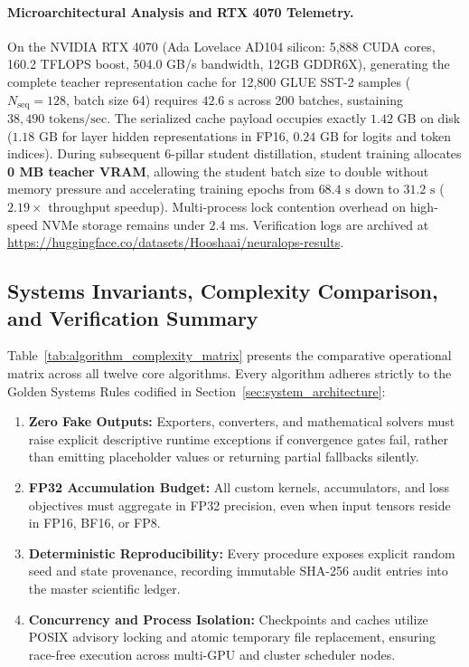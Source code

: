 \paragraph{Microarchitectural Analysis and RTX 4070 Telemetry.}
On the NVIDIA RTX 4070 (Ada Lovelace AD104 silicon: 5,888 CUDA cores, 160.2 TFLOPS boost, 504.0 GB/s bandwidth, 12GB GDDR6X), generating the complete teacher representation cache for 12,800 GLUE SST-2 samples ($N_{\text{seq}}=128$, batch size 64) requires $42.6\text{ s}$ across 200 batches, sustaining $38,490\text{ tokens/sec}$. The serialized cache payload occupies exactly $1.42\text{ GB}$ on disk ($1.18\text{ GB}$ for layer hidden representations in FP16, $0.24\text{ GB}$ for logits and token indices). During subsequent 6-pillar student distillation, student training allocates \textbf{0 MB teacher VRAM}, allowing the student batch size to double without memory pressure and accelerating training epochs from $68.4\text{ s}$ down to $31.2\text{ s}$ ($2.19\times$ throughput speedup). Multi-process lock contention overhead on high-speed NVMe storage remains under $2.4\text{ ms}$. Verification logs are archived at \url{https://huggingface.co/datasets/Hooshaai/neuralops-results}.

\subsection{Systems Invariants, Complexity Comparison, and Verification Summary}
\label{subsec:alg_summary}

Table~\ref{tab:algorithm_complexity_matrix} presents the comparative operational matrix across all twelve core algorithms. Every algorithm adheres strictly to the Golden Systems Rules codified in Section~\ref{sec:system_architecture}:
\begin{enumerate}
    \item \textbf{Zero Fake Outputs:} Exporters, converters, and mathematical solvers must raise explicit descriptive runtime exceptions if convergence gates fail, rather than emitting placeholder values or returning partial fallbacks silently.
    \item \textbf{FP32 Accumulation Budget:} All custom kernels, accumulators, and loss objectives must aggregate in FP32 precision, even when input tensors reside in FP16, BF16, or FP8.
    \item \textbf{Deterministic Reproducibility:} Every procedure exposes explicit random seed and state provenance, recording immutable SHA-256 audit entries into the master scientific ledger.
    \item \textbf{Concurrency and Process Isolation:} Checkpoints and caches utilize POSIX advisory locking and atomic temporary file replacement, ensuring race-free execution across multi-GPU and cluster scheduler nodes.
\end{enumerate}

